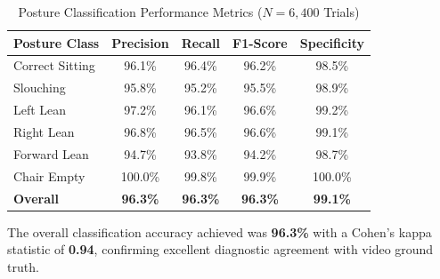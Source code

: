 \documentclass[conference]{IEEEtran}
\begin{document}
\begin{table}[htbp]
\caption{Posture Classification Performance Metrics ($N = 6,400$ Trials)}
\label{tab:posture_metrics}
\centering
\begin{tabular}{lcccc}
\toprule
\textbf{Posture Class} & \textbf{Precision} & \textbf{Recall} & \textbf{F1-Score} & \textbf{Specificity} \\
\midrule
Correct Sitting & 96.1\% & 96.4\% & 96.2\% & 98.5\% \\
Slouching       & 95.8\% & 95.2\% & 95.5\% & 98.9\% \\
Left Lean       & 97.2\% & 96.1\% & 96.6\% & 99.2\% \\
Right Lean      & 96.8\% & 96.5\% & 96.6\% & 99.1\% \\
Forward Lean    & 94.7\% & 93.8\% & 94.2\% & 98.7\% \\
Chair Empty     & 100.0\% & 99.8\% & 99.9\% & 100.0\% \\
\midrule
\textbf{Overall} & \textbf{96.3\%} & \textbf{96.3\%} & \textbf{96.3\%} & \textbf{99.1\%} \\
\bottomrule
\end{tabular}
\end{table}

The overall classification accuracy achieved was \textbf{96.3\%} with a Cohen's kappa statistic of \textbf{0.94}, confirming excellent diagnostic agreement with video ground truth.
\end{document}
